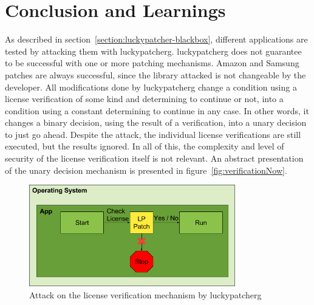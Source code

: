\section{Conclusion and Learnings} \label{section:luckypatcher-learnings}
As described in section~\ref{section:luckypatcher-blackbox}, different applications are tested by attacking them with \gls{luckypatcherg}.
\gls{luckypatcherg} does not guarantee to be successful with one or more patching mechanisms.
Amazon and Samsung patches are always successful, since the library attacked is not changeable by the developer.
\newline
\newline
All modifications done by \gls{luckypatcherg} change a condition using a license verification of some kind and determining to continue or not, into a condition using a constant determining to continue in any case.
In other words, it changes a binary decision, using the result of a verification, into a unary decision to just go ahead.
Despite the attack, the individual license verifications are still executed, but the results ignored.
In all of this, the complexity and level of security of the license verification itself is not relevant.
An abstract presentation of the unary decision mechanism is presented in figure~\ref{fig:verificationNow}.
\newline
\begin{figure}[h]
    \centering
    \includegraphics[width=0.8\textwidth]{data/verificationNowAttack.png}
    \caption{Attack on the license verification mechanism by \gls{luckypatcherg}}
    \label{fig:verificationNowAttack}
\end{figure}
